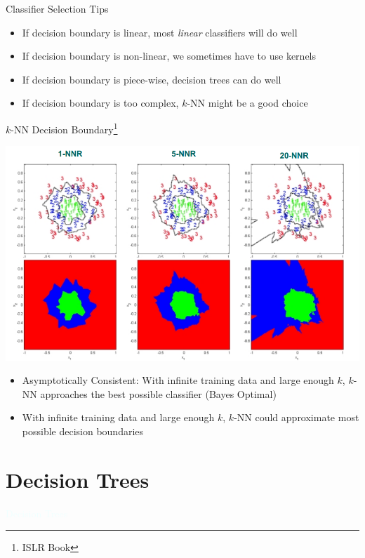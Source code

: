 \documentclass{beamer}
\newcommand{\thblue}[1]{{\Huge {\textcolor{azure}{#1}}}}
\begin{document}
\begin{frame}{Classifier Selection Tips}
    \begin{itemize}
        \item If decision boundary is linear, most {\em linear} classifiers will do well
        \item If decision boundary is non-linear, we sometimes have to use kernels 
        \item If decision boundary is piece-wise, decision trees can do well
        \item If decision boundary is too complex, $k$-NN might be a good choice
    \end{itemize}
\end{frame}

\begin{frame}{$k$-NN Decision Boundary\footnote{ISLR Book}}
    \begin{center}
        \includegraphics[scale=0.2]{kNNVaringK.png}
    \end{center}

    \begin{itemize}
       \item Asymptotically Consistent: With infinite training data and large enough $k$, $k$-NN approaches the best possible classifier (Bayes Optimal)
       \item With infinite training data and large enough $k$, $k$-NN could approximate most possible decision boundaries
    \end{itemize}
\end{frame}

\section{Decision Trees}
\begin{frame}{} 
    \begin{center}
        \thblue{Decision Trees}
    \end{center}
\end{frame}
\end{document}

